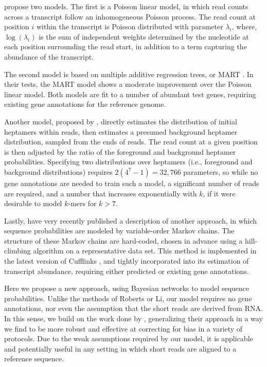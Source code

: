 \documentclass{bioinfo}
\begin{document}
\citet{Li2010} propose two models. The first is a Poisson linear model, in which
read counts across a transcript follow an inhomogeneous Poisson process. The
read count at position $i$ within the transcript is Poisson distributed with
parameter $\lambda_i$, where, $\log(\lambda_i)$ is the sum of independent
weights determined by the nucleotide at each position surrounding the read
start, in addition to a term capturing the abundance of the transcript.

The second model is based on multiple additive regression trees, or MART
\citep{Friedman2003}.  In their tests, the MART model shows a moderate
improvement over the Poisson linear model. Both models are fit to a number of
abundant test genes, requiring existing gene annotations for the reference
genome. 

Another model, proposed by \citet{Hansen2010}, directly estimates the
distribution of initial heptamers within reads, then estimates a presumed
background heptamer distribution, sampled from the ends of reads. The read count
at a given position is then adjusted by the ratio of the foreground and
background heptamer probabilities. Specifying two distributions over heptamers
(i.e., foreground and background distributions) requires \mbox{$2(4^7-1) =
32,766$} parameters, so while no gene annotations are needed to train such a
model, a significant number of reads are required, and a number that increases
exponentially with $k$, if it were desirable to model $k$-mers for $k > 7$.

Lastly, \citet{Roberts2011} have very recently published a description of
another approach, in which sequence probabilities are modeled by variable-order
Markov chains. The structure of these Markov chains are hard-coded, chosen in
advance using a hill-climbing algorithm on a representative data set. This method
is implemented in the latest version of Cufflinks \citep{Trapnell2010}, and
tightly incorporated into its estimation of transcript abundance, requiring
either predicted or existing gene annotations.

Here we propose a new approach, using Bayesian networks to model sequence
probabilities. Unlike the methods of Roberts or Li, our model requires no gene
annotations, nor even the assumption that the short reads are derived from RNA.
In this sense, we build on the work done by \citet{Hansen2010}, generalizing
their approach in a way we find to be more robust and effective at correcting
for bias in a variety of protocols. Due to the weak assumptions required by our
model, it is applicable and potentially useful in any setting in which short
reads are aligned to a reference sequence.
\end{document}
